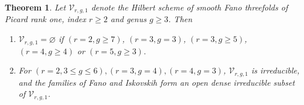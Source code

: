 \documentclass[11pt,twoside]{amsart}
\theoremstyle{plain}
\numberwithin{equation}{section}
\newtheorem{theorem}{Theorem}[section]
\theoremstyle{definition}
\begin{document}
\begin{theorem}\label{classification of fanos with index two}
Let $\mathcal{V}_{r,g,1}$ denote the Hilbert scheme of smooth Fano threefolds of Picard rank one, index $r \geq 2$ and genus $g \geq 3$. Then 
\begin{enumerate}
    \item $\mathcal{V}_{r,g,1} = \varnothing$ if $(r = 2, g \geq 7)$, $(r = 3, g = 3)$, $(r = 3, g \geq 5)$, $(r = 4, g \geq 4)$ or $(r = 5, g \geq 3)$. 
    \item For $(r = 2, 3 \leq g \leq 6), (r = 3, g = 4), (r = 4, g = 3)$, $\mathcal{V}_{r,g,1}$ is irreducible, and the families of Fano and Iskovskih form an open dense irreducible subset of $\mathcal{V}_{r,g,1}$.
\end{enumerate}
\end{theorem}
\end{document}
